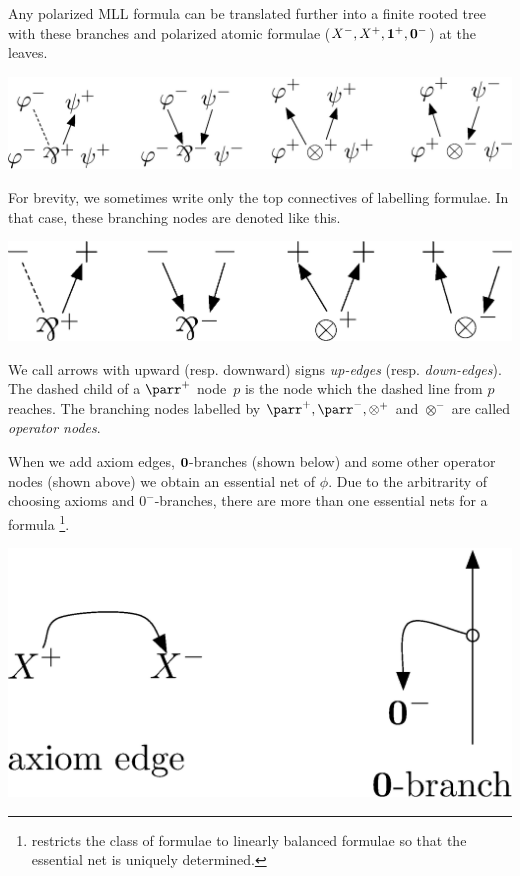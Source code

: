 Any polarized MLL formula can be translated further into
a finite rooted tree with these branches and polarized atomic formulae
($X^-, X^+, \mathbf{1}^+,\mathbf{0}^-$) at the leaves.
 \begin{center}
  \includegraphics[scale=0.4]{rules-original.eps}
 \end{center}
For brevity, we sometimes write only the top connectives of labelling
formulae.
In that case, these branching nodes are denoted like this.
 \begin{center} %
  \includegraphics[scale=0.4]{rules.eps}
 \end{center}
We call arrows with upward (resp. downward) signs
\textit{up-edges}
(resp. \textit{down-edges}).
The dashed child of a $\parr^+$ node~$p$ is the node which the dashed
line from $p$ reaches.
The branching nodes labelled by $\parr^+, \parr^-, \otimes^+$ and
$\otimes^-$ are called \textit{operator nodes}.

When we add axiom edges, $\mathbf{0}$-branches (shown below)
and some other operator nodes (shown above)
we obtain an
essential net of $\phi$.
Due to the arbitrarity of choosing axioms and $0^-$-branches,
there are more than one essential nets for a formula%
\footnote{\citet{murawski2003} restricts the class of formulae to linearly balanced
formulae so that the essential net is uniquely determined.}.
 \begin{center}
  \includegraphics[scale=0.4]{axiom-cut.eps}
 \end{center}


